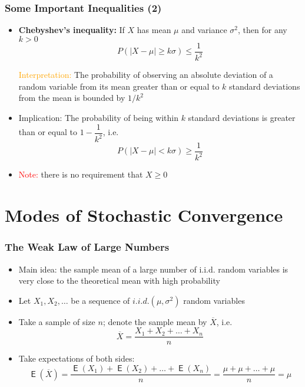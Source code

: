\documentclass[10pt]{beamer}
\DeclareMathOperator{\E}{\mathsf{E}}
\theoremstyle{definition}
\begin{document}
\begin{frame}[fragile]
	\frametitle{Some Important Inequalities (2)}
	\begin{itemize}
		\item \textbf{Chebyshev's inequality:} If $ X $ has mean $ \mu $ and variance $ \sigma^{2} $, then for any $ k > 0 $
		\[
			P(|X - \mu| \geq k\sigma) \leq \dfrac{1}{k^{2}}
		\]
		
		\textcolor{orange}{Interpretation:} The probability of observing an absolute deviation of a random variable from its mean greater than or equal to $ k $ standard deviations from the mean is bounded by $ 1/k^{2} $
		
		\item Implication: The probability of being within $ k $ standard deviations is greater than or equal to $ 1 - \dfrac{1}{k^{2}} $, i.e.
		\[
			P(|X - \mu| < k\sigma) \geq \dfrac{1}{k^{2}}
		\]
		
		\item \textcolor{red}{Note:} there is no requirement that $ X \geq 0 $
	\end{itemize}
\end{frame}

\section{Modes of Stochastic Convergence}
\begin{frame}[fragile]
	\frametitle{The Weak Law of Large Numbers}
	\begin{itemize}
		\item Main idea: the sample mean of a large number of i.i.d. random variables is very close to the theoretical mean with high probability
		
		\item Let $ X_{1}, X_{2}, \ldots $ be a sequence of $ i.i.d.(\mu, \sigma^{2}) $ random variables
		
		\item Take a sample of size $ n $; denote the sample mean by $ \overline{X} $, i.e.
		\[
			\overline{X} = \dfrac{X_{1} + X_{2} + \ldots + X_{n}}{n}
		\]
		
		\item Take expectations of both sides:
		\[
			\E(\overline{X}) = \dfrac{\E(X_{1}) + \E(X_{2}) + \ldots + \E(X_{n})}{n} = \dfrac{\mu + \mu + \ldots + \mu}{n} = \mu
		\]
	\end{itemize}
\end{frame}
\end{document}
